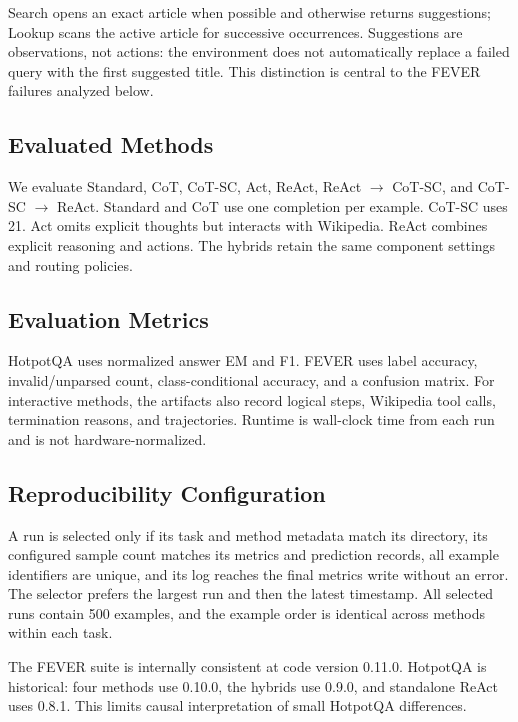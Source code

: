 \documentclass[10pt]{article}
\begin{document}
Search opens an exact article when possible and otherwise returns suggestions; Lookup scans the active article for successive occurrences. Suggestions are observations, not actions: the environment does not automatically replace a failed query with the first suggested title. This distinction is central to the FEVER failures analyzed below.

\subsection{Evaluated Methods}

We evaluate Standard, CoT, CoT-SC, Act, ReAct, ReAct $\rightarrow$ CoT-SC, and CoT-SC $\rightarrow$ ReAct. Standard and CoT use one completion per example. CoT-SC uses 21. Act omits explicit thoughts but interacts with Wikipedia. ReAct combines explicit reasoning and actions. The hybrids retain the same component settings and routing policies.

\subsection{Evaluation Metrics}

HotpotQA uses normalized answer EM and F1. FEVER uses label accuracy, invalid/unparsed count, class-conditional accuracy, and a confusion matrix. For interactive methods, the artifacts also record logical steps, Wikipedia tool calls, termination reasons, and trajectories. Runtime is wall-clock time from each run and is not hardware-normalized.

\subsection{Reproducibility Configuration}

A run is selected only if its task and method metadata match its directory, its configured sample count matches its metrics and prediction records, all example identifiers are unique, and its log reaches the final metrics write without an error. The selector prefers the largest run and then the latest timestamp. All selected runs contain 500 examples, and the example order is identical across methods within each task.

The FEVER suite is internally consistent at code version 0.11.0. HotpotQA is historical: four methods use 0.10.0, the hybrids use 0.9.0, and standalone ReAct uses 0.8.1. This limits causal interpretation of small HotpotQA differences.
\end{document}
